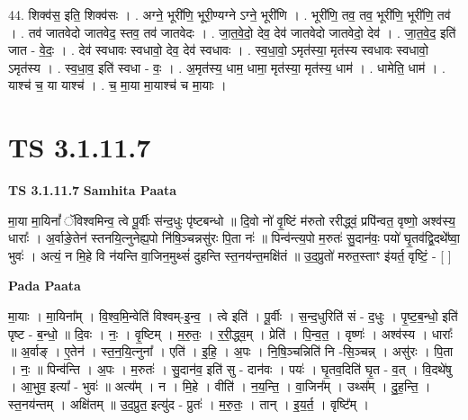 \documentclass[17pt]{extarticle}
\begin{document}
44. शिक्व॑स॒ इति॒ शिक्व॑सः । . अग्ने॒ भूरी॑णि॒ भूरी॒ण्यग्ने ऽग्ने॒ भूरी॑णि । . भूरी॑णि॒ तव॒ तव॒ भूरी॑णि॒ भूरी॑णि॒ तव॑ । . तव॑ जातवेदो जातवेद॒ स्तव॒ तव॑ जातवेदः । . जा॒त॒वे॒दो॒ देव॒ देव॑ जातवेदो जातवेदो॒ देव॑ । . जा॒त॒वे॒द॒ इति॑ जात - वे॒दः॒ । . देव॑ स्वधावः स्वधावो॒ देव॒ देव॑ स्वधावः । . स्व॒धा॒वो॒ ऽमृत॑स्या॒ मृत॑स्य स्वधावः स्वधावो॒ ऽमृत॑स्य । . स्व॒धा॒व॒ इति॑ स्वधा - वः॒ । . अ॒मृत॑स्य॒ धाम॒ धामा॒ मृत॑स्या॒ मृत॑स्य॒ धाम॑ । . धामेति॒ धाम॑ । . याश्च॑ च॒ या याश्च॑ । . च॒ मा॒या मा॒याश्च॑ च मा॒याः । \newline
\pagebreak
{}

\section{ TS 3.1.11.7 }

\textbf{TS 3.1.11.7 } \newline
\textbf{Samhita Paata} \newline

मा॒या मा॒यिनां᳚ ॅविश्वमिन्व॒ त्वे पू॒र्वीः स॑न्द॒धुः पृ॑ष्टबन्धो ॥ दि॒वो नो॑ वृ॒ष्टिं म॑रुतो ररीद्ध्वं॒ प्रपि॑न्वत॒ वृष्णो॒ अश्व॑स्य॒ धाराः᳚ । अ॒र्वाङे॒तेन॑ स्तनयि॒त्नुनेह्य॒पो नि॑षि॒ञ्चन्नसु॑रः पि॒ता नः॑ ॥ पिन्व॑न्त्य॒पो म॒रुतः॑ सु॒दान॑वः॒ पयो॑ घृ॒तव॑द्वि॒दथे᳚ष्वा॒ भुवः॑ । अत्यं॒ न मि॒हे वि न॑यन्ति वा॒जिन॒मुथ्सं॑ दुहन्ति स्त॒नय॑न्त॒मक्षि॑तं ॥ उ॒द॒प्रुतो॑ मरुत॒स्ताꣳ इ॑यर्त॒ वृष्टिं॒ - [  ] \newline

\textbf{Pada Paata} \newline

मा॒याः । मा॒यिना᳚म् । वि॒श्व॒मि॒न्वेति॑ विश्वम्-इ॒न्व॒ । त्वे इति॑ । पू॒र्वीः । स॒न्द॒धुरिति॑ सं - द॒धुः । पृ॒ष्ट॒ब॒न्धो॒ इति॑ पृष्ट - ब॒न्धो॒ ॥ दि॒वः । नः॒ । वृ॒ष्टिम् । म॒रु॒तः॒ । र॒री॒द्ध्व॒म् । प्रेति॑ । पि॒न्व॒त॒ । वृष्णः॑ । अश्व॑स्य । धाराः᳚ ॥ अ॒र्वाङ् । ए॒तेन॑ । स्त॒न॒यि॒त्नुना᳚ । एति॑ । इ॒हि॒ । अ॒पः । नि॒षि॒ञ्चन्निति॑ नि -सि॒ञ्चन्न् । असु॑रः । पि॒ता । नः॒ ॥ पिन्व॑न्ति । अ॒पः । म॒रुतः॑ । सु॒दान॑व॒ इति॑ सु - दान॑वः । पयः॑ । घृ॒तव॒दिति॑ घृ॒त - व॒त् । वि॒दथे॑षु । आ॒भुव॒ इत्या᳚ - भुवः॑ ॥ अत्य᳚म् । न । मि॒हे । वीति॑ । न॒य॒न्ति॒ । वा॒जिन᳚म् । उथ्स᳚म् । दु॒ह॒न्ति॒ । स्त॒नय॑न्तम् । अक्षि॑तम् ॥ उ॒द॒प्रुत॒ इत्यु॑द - प्रुतः॑ । म॒रु॒तः॒ । तान् । इ॒य॒र्त॒ । वृष्टि᳚म् ।  \newline
\end{document}
